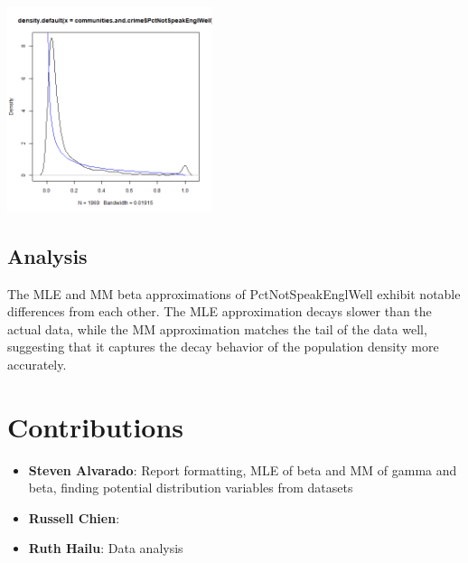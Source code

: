 \documentclass[12pt, letterpaper]{report}
\begin{document}
\begin{center}
\includegraphics[width=0.45\textwidth]{beta/PctNotSpeakEnglWell_mm}
\end{center}

\section{Analysis}
The MLE and MM beta approximations of PctNotSpeakEnglWell exhibit notable differences from each other.
The MLE approximation decays slower than the actual data, while the MM approximation matches the tail of the data well, suggesting that it captures the decay behavior of the population density more accurately.



\chapter{Contributions}
\begin{itemize}
 \item \textbf{Steven Alvarado}: Report formatting, MLE of beta and MM of gamma and beta, finding potential distribution variables from datasets
 \item \textbf{Russell Chien}:
 \item \textbf{Ruth Hailu}: Data analysis
\end{itemize}
\end{document}
